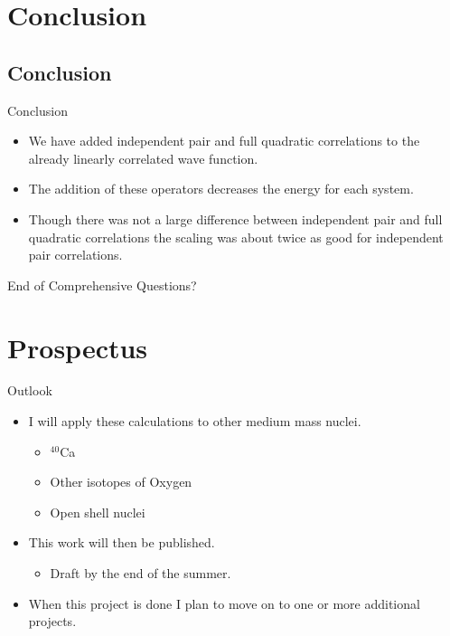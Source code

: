 \documentclass{beamer}
\begin{document}
\section{Conclusion}
\subsection{Conclusion}
\begin{frame}{Conclusion}
\begin{itemize}
   \item We have added independent pair and full quadratic correlations to the already linearly correlated wave function.
   \item The addition of these operators decreases the energy for each system.
   \item Though there was not a large difference between independent pair and full quadratic correlations the scaling was about twice as good for independent pair correlations.
\end{itemize}
\end{frame}

\begin{frame}{End of Comprehensive}
   Questions?
\end{frame}

\section{Prospectus}
\begin{frame}{Outlook}
\begin{itemize}
   \item{I will apply these calculations to other medium mass nuclei.}
   \begin{itemize}
      \item $^{40}$Ca
      \item Other isotopes of Oxygen
      \item Open shell nuclei
   \end{itemize}
   \item This work will then be published.
   \begin{itemize}
      \item Draft by the end of the summer.
   \end{itemize}
   \item When this project is done I plan to move on to one or more additional projects.
\end{itemize}
\end{frame}
\end{document}
